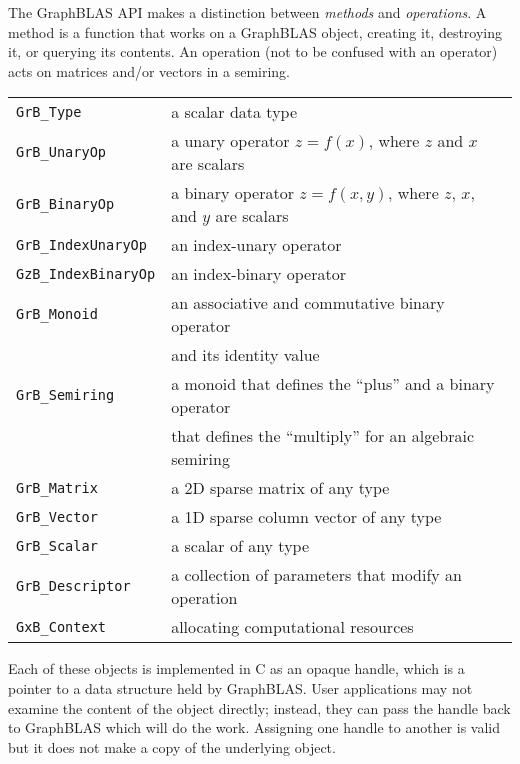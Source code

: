 \documentclass[12pt]{article}
\begin{document}
The GraphBLAS API makes a distinction between {\em methods} and {\em
operations}.  A method is a function that works on a GraphBLAS object, creating
it, destroying it, or querying its contents.  An operation (not to be confused
with an operator) acts on matrices and/or vectors in a semiring.

\vspace{0.1in}
\noindent
{\small
\begin{tabular}{ll}
\hline
\verb'GrB_Type'      & a scalar data type \\
\verb'GrB_UnaryOp'   & a unary operator $z=f(x)$, where $z$ and $x$ are scalars\\
\verb'GrB_BinaryOp'  & a binary operator $z=f(x,y)$, where $z$, $x$, and $y$ are scalars\\
\verb'GrB_IndexUnaryOp'  & an index-unary operator \\
\verb'GzB_IndexBinaryOp'  & an index-binary operator \\
\verb'GrB_Monoid'    & an associative and commutative binary operator  \\
                     & and its identity value \\
\verb'GrB_Semiring'  & a monoid that defines the ``plus'' and a binary operator\\
                     & that defines the ``multiply'' for an algebraic semiring \\
\verb'GrB_Matrix'    & a 2D sparse matrix of any type \\
\verb'GrB_Vector'    & a 1D sparse column vector of any type \\
\verb'GrB_Scalar'    & a scalar of any type \\
\verb'GrB_Descriptor'& a collection of parameters that modify an operation \\
\verb'GxB_Context'   & allocating computational resources \\
\hline
\end{tabular}
}
\vspace{0.1in}

Each of these objects is implemented in C as an opaque handle, which is a
pointer to a data structure held by GraphBLAS.  User applications may not
examine the content of the object directly; instead, they can pass the handle
back to GraphBLAS which will do the work.  Assigning one handle to another
is valid but it does not make a copy of the underlying object.

\newpage
\end{document}
